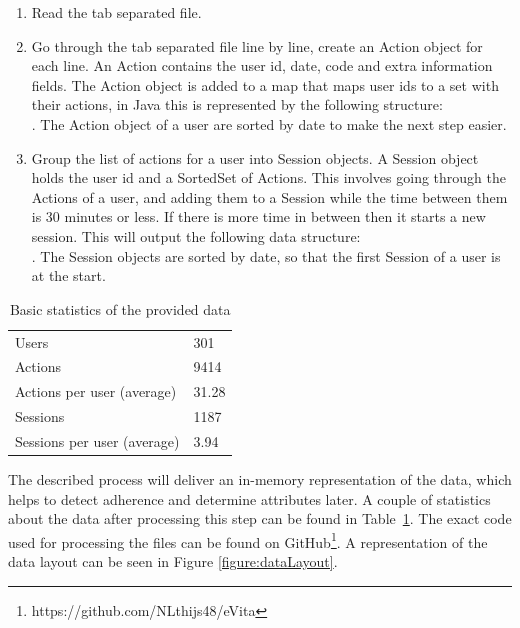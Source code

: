 \begin{enumerate}
	\item Read the tab separated file.
	\item Go through the tab separated file line by line, create an Action object for each line. An Action contains the user id, date, code and extra information fields. The Action object is added to a map that maps user ids to a set with their actions, in Java this is represented by the following structure:\\ . The Action object of a user are sorted by date to make the next step easier.
	\item Group the list of actions for a user into Session objects. A Session object holds the user id and a SortedSet of Actions. This involves going through the Actions of a user, and adding them to a Session while the time between them is 30 minutes or less. If there is more time in between then it starts a new session. This will output the following data structure:\\ . The Session objects are sorted by date, so that the first Session of a user is at the start.
\end{enumerate}

\begin{table}[!h]
	\centering
	\caption{Basic statistics of the provided data}
	\label{table:dataStats}
	\begin{tabular}{@{}ll@{}}
		\toprule
		Users                       & 301   \\
		Actions                     & 9414  \\
		Actions per user (average)  & 31.28 \\
		Sessions                    & 1187  \\
		Sessions per user (average) & 3.94  \\ \bottomrule
	\end{tabular}
\end{table}

The described process will deliver an in-memory representation of the data, which helps to detect adherence and determine attributes later. A couple of statistics about the data after processing this step can be found in Table~\ref{table:dataStats}. The exact code used for processing the files can be found on GitHub\footnote{https://github.com/NLthijs48/eVita}. A representation of the data layout can be seen in Figure \ref{figure:dataLayout}.

